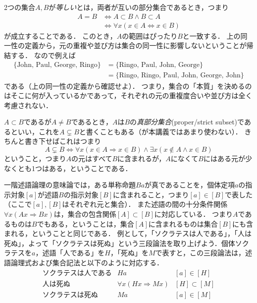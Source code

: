 \documentclass[11pt,a4paper]{jsarticle}
\begin{document}
2つの集合$A,B$が\emph{等しい}とは，両者が互いの部分集合であるとき，つまり
\begin{align*}
 A = B &\iff A \subset B \wedge B \subset A \\
&\iff \forall x (x \in A \iff x \in B)
\end{align*}
 が成立することである．
このとき，$A$の範囲はぴったり$B$と一致する．
上の同一性の定義から，元の重複や並び方は集合の同一性に影響しないということが帰結する．
なので例えば
\begin{align*}
 \{\text{John, Paul, George, Ringo}\} 
 &= \{\text{Ringo, Paul, John, George}\} \\
 &= \{\text{Ringo, Ringo, Paul, John, George, John}\}
\end{align*}
である（上の同一性の定義から確認せよ）．
つまり，集合の「本質」を決めるのはそこに何が入っているかであって，それぞれの元の重複度合いや並び方は全く考慮されない．

$A \subset B$であるが$A \neq B$であるとき，$A$は$B$の\emph{真部分集合}(proper/strict subset)であるといい，これを$A \subsetneq B$と書くこともある（が本講義ではあまり使わない）．
きちんと書き下せばこれはつまり
\[
A \subsetneq B \iff \forall x (x \in A \Rightarrow x \in B) \wedge \exists x (x \not\in A \wedge x \in B)
\]
ということ，つまり$A$の元はすべて$B$に含まれるが，$A$になくて$B$にはある元が少なくとも1つはある，ということである．



\begin{rei}{}{}
一階述語論理の意味論では，ある単称命題$Ba$が真であることを，個体定項$a$の指示対象$[a]$が述語$B$の指示対象$[B]$に含まれること，つまり$[a] \in [B]$で表した（ここで$[a], [B]$はそれぞれ元と集合）．
また述語の間の十分条件関係$\forall x (Ax \Rightarrow Bx)$は，集合の包含関係$[A] \subset [B]$に対応している．
つまり$A$であるものは$B$でもある，ということは，集合$[A]$に含まれるものは集合$[B]$にも含まれる，ということと同じである．
例として，「ソクラテスは人である」，「人は死ぬ」，よって「ソクラテスは死ぬ」という三段論法を取り上げよう．個体ソクラテスを$a$，述語「人である」を$H$，「死ぬ」を$M$で表すと，この三段論法は，述語論理式および集合記法と以下のように対応する．
\[
\begin{array}{lll}
  \text{ソクラテスは人である} & Ha & [a] \in [H] \\
  \text{人は死ぬ} & \forall x (Hx \Rightarrow Mx) & [H] \subset [M] \\ \hline
  \text{ソクラテスは死ぬ} & Ma & [a] \in [M]
\end{array}
\]
\end{rei}{}{}
\end{document}
